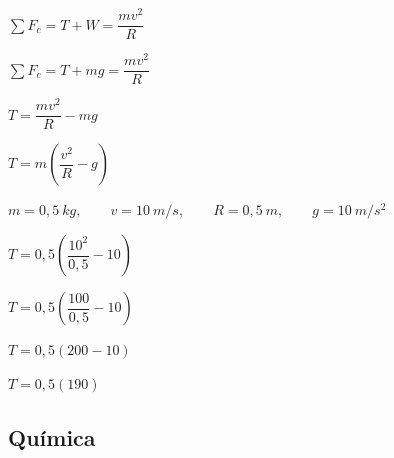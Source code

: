 \begin{enumerate}
	
	$\sum F_c=T+W=\dfrac{mv^2}{R}$
	
	$\sum F_c=T+mg=\dfrac{mv^2}{R}$
	
	
	$T=\dfrac{mv^2}{R}-mg$
	
	$T=m\left(\dfrac{v^2}{R}-g\right)$
	
	$m=0{,}5\ kg,\qquad v=10\ m/s,\qquad R=0{,}5\ m,\qquad g=10\ m/s^2$
	
	$T=0{,}5\left(\dfrac{10^2}{0{,}5}-10\right)$
	
	$T=0{,}5\left(\dfrac{100}{0{,}5}-10\right)$
	
	$T=0{,}5(200-10)$
	
	$T=0{,}5(190)$
	
	
	\vspace{6mm}
	
	
	
	
	
	
\end{enumerate}


\subsection*{Química}

